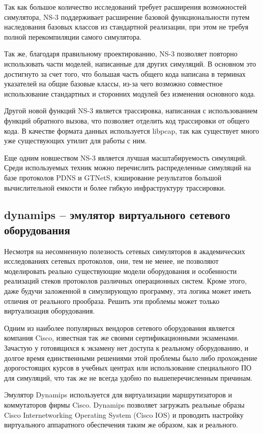 Так как большое количество исследований требует расширения возможностей
симулятора, NS-3 поддерживает расширение базовой функциональности путем
наследования базовых классов из стандартной реализации, при этом не требуя 
полной перекомпиляции самого симулятора.

Так же, благодаря правильному проектированию, NS-3 позволяет повторно использовать
части моделей, написанные для других симуляций. В основном это достигнуто за счет
того, что большая часть общего кода написана в терминах указателей на общие базовые классы,
из-за чего возможно совместное использование стандартных и сторонних модулей без 
изменения основного кода.

Другой новой функций NS-3 является трассировка, написанная с использованием
функций обратного вызова, что позволяет отделить код трассировки от общего кода.
В качестве формата данных используется libpcap, так как существует много уже существующих
утилит для работы с ним.

Еще одним новшеством NS-3 является лучшая масштабируемость симуляций. Среди используемых
техник можно перечислить распределенные симуляций на базе протоколов PDNS и GTNetS,
кэширование результатов большой вычислительной емкости и более гибкую инфраструктуру
трассировки.

\subsection{dynamips -- эмулятор виртуального сетевого оборудования}

Несмотря на несомненную полезность сетевых симуляторов в академических исследованиях
сетевых протоколов, они, тем не менее, не позволяют моделировать реально существующие
модели оборудования и особенности реализаций стеков протоколов различных операционных
систем. Кроме этого, даже будучи заложенной в симулирующую программу, эта логика
может иметь отличия от реального прообраза.
Решить эти проблемы может только виртуализация оборудования.

Одним из наиболее популярных вендоров сетевого оборудования является компания Cisco,
известная так же своими сертификационными экзаменами. Зачастую у готовящихся
к экзамену нет доступа к реальному оборудованию, и долгое время единственными решениями
этой проблемы было либо прохождение дорогостоящих курсов в учебных центрах или 
использование специального ПО для симуляций, что так же не всегда удобно по 
вышеперечисленным причинам.

Эмулятор Dynamips\cite{website:dynamips} используется для виртуализации маршрутизаторов и 
коммутаторов фирмы Cisco. 
Dynamips позволяет загружать реальные образы Cisco Internetworking Operating 
System (Cisco IOS) и проводить
настройку виртуального аппаратного обеспечения таким же образом, как и реального.
\cite{Zhang:2011:CCV:1975507.1976866}

